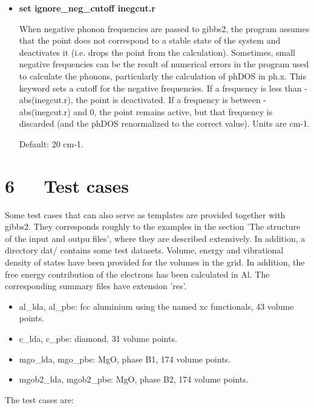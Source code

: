 \documentclass[a4paper]{article}
\begin{document}
\begin{itemize}
\item \textbf{set ignore\_neg\_cutoff inegcut.r}

When negative phonon frequencies are passed to gibbs2, the program
assumes that the point does not correspond to a stable state of
the system and deactivates it (i.e. drops the point from the
calculation). Sometimes, small negative frequencies can be the
result of numerical errors in the program used to calculate the
phonons, particularly the calculation of phDOS in ph.x. This keyword
sets a cutoff for the negative frequencies. If a frequency is
less than -abs(inegcut.r), the point is deactivated. If a frequency
is between -abs(inegcut.r) and 0, the point remains active, but
that frequency is discarded (and the phDOS renormalized to the
correct value). Units are cm-1.

Default: 20 cm-1.
\end{itemize}


\section{6   Test cases%
  \label{test-cases}%
}

Some test cases that can also serve as templates are provided together
with gibbs2. They corresponds roughly to the examples in the section
'The structure of the input and outpu files', where they are described
extensively. In addition, a directory dat/ contains some test
datasets. Volume, energy and vibrational density of states have been
provided for the volumes in the grid. In addition, the free energy
contribution of the electrons has been calculated in Al. The
corresponding summary files have extension 'res'.

\begin{itemize}
\item al\_lda, al\_pbe: fcc aluminium using the named xc functionals, 43
volume points.

\item c\_lda, c\_pbe: diamond, 31 volume points.

\item mgo\_lda, mgo\_pbe: MgO, phase B1, 174 volume points.

\item mgob2\_lda, mgob2\_pbe: MgO, phase B2, 174 volume points.
\end{itemize}

The test cases are:
\end{document}
